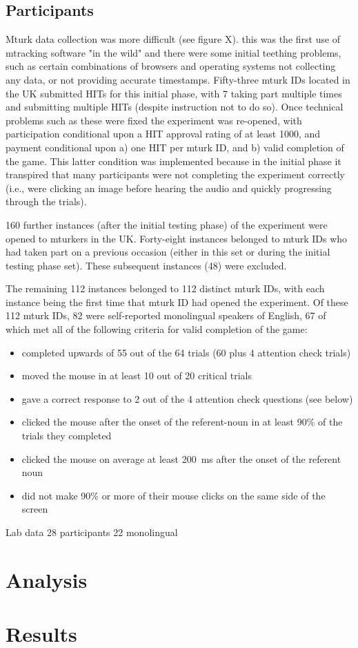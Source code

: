 \documentclass[a4paper,man,natbib]{apa6}
\begin{document}
\subsection*{Participants}

Mturk data collection was more difficult (see figure X).%
this was the first use of mtracking software "in the wild" and there were some initial teething problems, such as certain combinations of browsers and operating systems not collecting any data, or not providing accurate timestamps. 
Fifty-three mturk IDs located in the UK submitted HITs for this initial phase, with 7 taking part multiple times and submitting multiple HITs (despite instruction not to do so).
Once technical problems such as these were fixed the experiment was re-opened, with participation conditional upon a HIT approval rating of at least 1000, and payment conditional upon a) one HIT per mturk ID, and b) valid completion of the game. 
This latter condition was implemented because in the initial phase it transpired that many participants were not completing the experiment correctly (i.e., were clicking an image before hearing the audio and quickly progressing through the trials). 

160 further instances (after the initial testing phase) of the experiment were opened to mturkers in the UK. 
Forty-eight instances belonged to mturk IDs who had taken part on a previous occasion (either in this set or during the initial testing phase set).
These subsequent instances (48) were excluded.

The remaining 112 instances belonged to 112 distinct mturk IDs, with each instance being the first time that mturk ID had opened the experiment. 
Of these 112 mturk IDs, 82 were self-reported monolingual speakers of English, 67 of which met all of the following criteria for valid completion of the game:  
\begin{itemize}
\item completed upwards of 55 out of the 64 trials (60 plus 4 attention check trials)
\item moved the mouse in at least 10 out of 20 critical trials
\item gave a correct response to 2 out of the 4 attention check questions (see below)
\item clicked the mouse after the onset of the referent-noun in at least 90\% of the trials they completed
\item clicked the mouse on average at least 200~ms after the onset of the referent noun
\item did not make 90\% or more of their mouse clicks on the same side of the screen
\end{itemize}

Lab data
28 participants
22 monolingual

\section*{Analysis}

\section*{Results}
\end{document}
